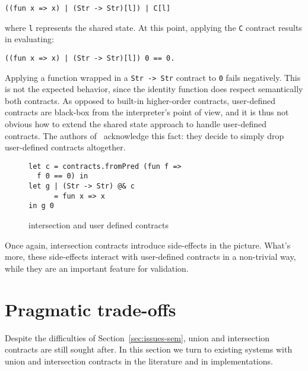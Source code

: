 \documentclass[sigplan,10pt,review,anonymous]{acmart}
\newcommand{\unsure}[2][1=]{}
\newcommand{\nickel}[1]{\lstinline[language=nickel]{#1}}
\begin{document}
\begin{lstlisting}[language=nickel,frame=none,numbers=none,title={Stateful
decomposition}]
((fun x => x) | (Str -> Str)[l]) | C[l]
\end{lstlisting}

where \nickel{l} represents the shared state.  At this point,
applying the \nickel{C} contract results in evaluating:

\begin{lstlisting}[language=nickel,frame=none,numbers=none]
((fun x => x) | (Str -> Str)[l]) 0 == 0.
\end{lstlisting}

Applying a function wrapped in a \nickel{Str -> Str} contract to \nickel{0}
fails negatively. This is not the expected behavior, since the identity function
does respect semantically both contracts. As opposed to built-in higher-order
contracts, user-defined contracts are black-box from the interpreter's point of
view, and it is thus not obvious how to extend the shared state approach to
handle user-defined contracts. The authors of~\cite{RootCauseOfBlame}
acknowledge this fact: they decide to simply drop user-defined contracts
altogether.

\begin{figure}[h]
\begin{lstlisting}[language=nickel]
let c = contracts.fromPred (fun f =>
  f 0 == 0) in
let g | (Str -> Str) @& c
      = fun x => x
in g 0
\end{lstlisting}
\caption{intersection and user defined contracts}
\label{fig:inter-flat-contracts}
\end{figure}

Once again, intersection contracts introduce side-effects in the picture. What's
more, these side-effects interact with user-defined contracts in a non-trivial
way, while they are an important feature for validation.
\unsure{(Yann) Should we talk about thiemann here, who do support user-defined
contracts?}

\section{Pragmatic trade-offs}
\label{sec:issues-literature}

Despite the difficulties of Section~\ref{sec:issues-sem}, union and
intersection contracts are still sought after. In this section we turn
to existing systems with union and intersection contracts in the
literature and in implementations.
\end{document}

